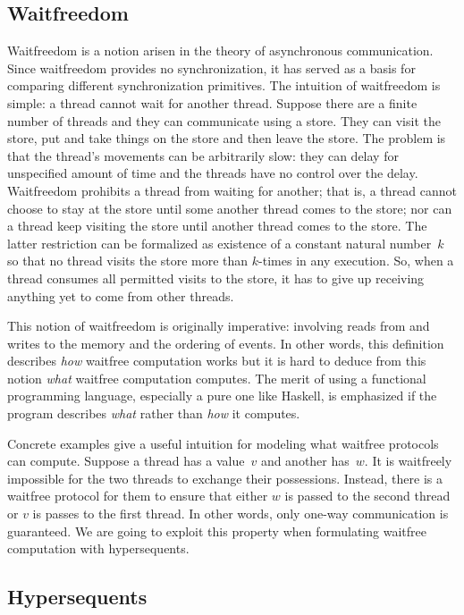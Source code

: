 \documentclass[doctor]{iscs-thesis}
\begin{document}
\subsection{Waitfreedom}
\label{subsect:wf}

Waitfreedom is a notion arisen in the theory of asynchronous
communication. Since waitfreedom provides no synchronization, it has
served as a basis for comparing different synchronization primitives.
The intuition of waitfreedom is simple: a thread cannot
wait for another thread.  Suppose there are a finite number of threads and they can
communicate using a store. They can
visit the store, put and take things on the store and then leave the
store. The problem is that the thread's movements can be arbitrarily
slow: they can delay for unspecified amount of time and the threads
have no control over the delay. Waitfreedom prohibits a thread from
waiting for another; that is, a thread cannot choose to stay at the
store until some another thread comes to the store; nor can a thread
keep visiting the store until another thread comes to the store.  The
latter restriction can be formalized as existence of a constant natural
number~$k$ so
that no thread visits the store more than
$k$-times in any execution.  So, when a thread consumes all permitted
visits to the store, it has to give up receiving anything yet to come
from
other threads.

This notion of waitfreedom is originally imperative: involving reads from and writes to
the memory and the ordering of events.  In other words, this definition
describes \textit{how} waitfree computation works but it is hard to deduce from
this notion \textit{what} waitfree computation computes.
The merit of using a functional programming language, especially a pure
one like Haskell, is emphasized if the program describes \textit{what}
rather than \textit{how} it computes.

Concrete examples give a useful intuition for modeling what waitfree
protocols can compute.
Suppose a thread has a value~$v$ and another has~$w$.
It is waitfreely impossible for the two threads to exchange their
possessions.  Instead, there is a waitfree protocol for them to ensure
that either $w$ is passed to the second thread or $v$ is passes to the
first thread.
In other words, only one-way communication is guaranteed.  We are going
to exploit this property when formulating waitfree computation with hypersequents.


\subsection{Hypersequents}
\end{document}
